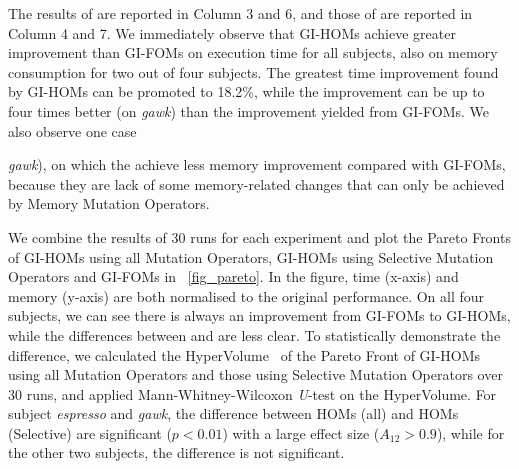 \documentclass[oribibl]{llncs}
\begin{document}
The results of \homss{} are reported in Column 3 and 6, and those of \homsa{} are reported in Column 4 and 7. We immediately observe that GI-HOMs achieve greater improvement than GI-FOMs on execution time for all subjects, also on memory consumption for two out of four subjects. The greatest time improvement found by GI-HOMs can be promoted to 18.2\%, while the improvement can be up to four times better (on \emph{gawk}) than the improvement yielded from GI-FOMs. We also observe one case {\emph{gawk}), on which the \homss{} achieve less memory improvement compared with GI-FOMs, because they are lack of some memory-related changes that can only be achieved by Memory Mutation Operators. 




We combine the results of 30 runs for each experiment and plot the Pareto Fronts of GI-HOMs using all Mutation Operators, GI-HOMs using Selective Mutation Operators and GI-FOMs in \figurename~\ref{fig_pareto}.
In the figure, time (x-axis) and memory (y-axis) are both normalised to the original performance.
On all four subjects, we can see there is always an improvement from GI-FOMs to GI-HOMs, while the differences between \homss{} and \homsa{} are less clear. 
To statistically demonstrate the difference, we calculated the HyperVolume~\cite{797969} of the Pareto Front of GI-HOMs using all Mutation Operators and those using Selective Mutation Operators over 30 runs, and applied Mann-Whitney-Wilcoxon \emph{U}-test on the HyperVolume. For subject \emph{espresso} and \emph{gawk}, the difference between HOMs (all) and HOMs (Selective) are significant ($p<0.01$) with a large effect size ($A_{12} > 0.9$), while for the other two subjects, the difference is not significant.

}
\end{document}
